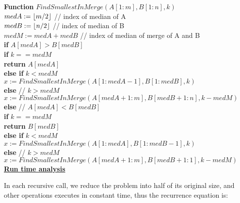 \documentclass[11pt]{article}
\DeclarePairedDelimiter\floor{\lfloor}{\rfloor}
\begin{document}
\begin{enumerate}
  \textbf{Function} $FindSmallestInMerge(A[1:m], B[1:n], k)$\\
  \-\hspace{2em} $medA := \floor{m/2}$ // index of median of A \\
  \-\hspace{2em} $medB := \floor{n/2}$ // index of median of B \\
  \-\hspace{2em} $medM := medA + medB$ // index of median of merge of A
  and B \\
  \-\hspace{2em} \textbf{if} $A[medA] > B[medB]$\\
  \-\hspace{4em} \textbf{if} $k == medM$\\
  \-\hspace{6em} \textbf{return} $A[medA]$\\
  \-\hspace{4em} \textbf{else if} $k < medM$\\
  \-\hspace{6em} $ x := FindSmallestInMerge(A[1:medA-1], B[1:medB], k)$\\ 
  \-\hspace{4em} \textbf{else} // $k > medM$\\
  \-\hspace{6em} $ x := FindSmallestInMerge(A[medA+1:m], B[medB+1:n], k-medM)$\\ 
  \-\hspace{2em} \textbf{else} // $A[medA] < B[medB]$\\
  \-\hspace{4em} \textbf{if} $k == medM$\\
  \-\hspace{6em} \textbf{return} $B[medB]$\\
  \-\hspace{4em} \textbf{else if} $k < medM$\\
  \-\hspace{6em} $ x := FindSmallestInMerge(A[1:medA], B[1:medB-1], k)$\\ 
  \-\hspace{4em} \textbf{else} // $k > medM$\\
  \-\hspace{6em} $ x := FindSmallestInMerge(A[medA+1:m], B[medB+1:1], k-medM)$\\ 

  \underline{\textbf{Run time analysis}}

  In each recursive call, we reduce the problem into half of its
  original size, and other operations executes in constant time, thus
  the recurrence equation is:


\end{enumerate}
\end{document}

